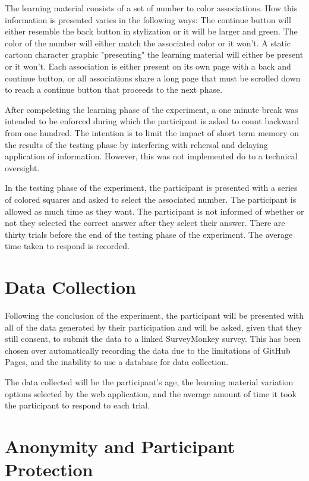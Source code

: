 \documentclass[12pt]{report}
\begin{document}
The learning material consists of a set of number to color associations. How this information is presented varies in the following ways: The continue button will either resemble the back button in stylization or it will be larger and green. The color of the number will either match the associated color or it won't. A static cartoon character graphic "presenting" the learning material will either be present or it won't. Each association is either present on its own page with a back and continue button, or all associations share a long page that must be scrolled down to reach a continue button that proceeds to the next phase.

After compeleting the learning phase of the experiment, a one minute break was intended to be enforced during which the participant is asked to count backward from one hundred. The intention is to limit the impact of short term memory on the results of the testing phase by interfering with rehersal and delaying application of information.\cite{cowan2008differences} However, this was not implemented do to a technical oversight.

In the testing phase of the experiment, the participant is presented with a series of colored squares and asked to select the associated number. The participant is allowed as much time as they want. The participant is not informed of whether or not they selected the correct answer after they select their answer. There are thirty trials before the end of the testing phase of the experiment. The average time taken to respond is recorded.

\section{Data Collection}

Following the conclusion of the experiment, the participant will be presented with all of the data generated by their participation and will be asked, given that they still consent, to submit the data to a linked SurveyMonkey survey. This has been chosen over automatically recording the data due to the limitations of GitHub Pages, and the inability to use a database for data collection.

The data collected will be the participant's age, the learning material variation options selected by the web application, and the average amount of time it took the participant to respond to each trial.

\section{Anonymity and Participant Protection}
\end{document}
